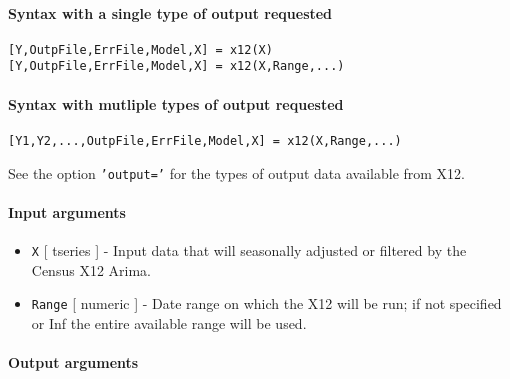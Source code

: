 


	\paragraph{Syntax with a single type of output
requested}

\begin{verbatim}
[Y,OutpFile,ErrFile,Model,X] = x12(X)
[Y,OutpFile,ErrFile,Model,X] = x12(X,Range,...)
\end{verbatim}

\paragraph{Syntax with mutliple types of output
requested}

\begin{verbatim}
[Y1,Y2,...,OutpFile,ErrFile,Model,X] = x12(X,Range,...)
\end{verbatim}

See the option \texttt{'output='} for the types of output data available
from X12.

\paragraph{Input arguments}

\begin{itemize}
\item
  \texttt{X} {[} tseries {]} - Input data that will seasonally adjusted
  or filtered by the Census X12 Arima.
\item
  \texttt{Range} {[} numeric {]} - Date range on which the X12 will be
  run; if not specified or Inf the entire available range will be used.
\end{itemize}

\paragraph{Output arguments}


